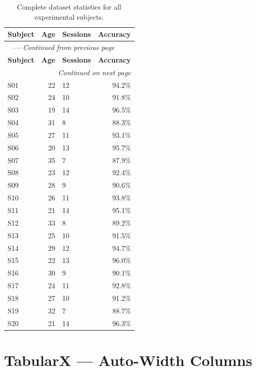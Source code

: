 \documentclass[
    language=english,
    doctype=article,
    institution=none,
]{../../omnilatex}
\begin{document}
\begin{longtable}{lrlr}
    \caption{Complete dataset statistics for all experimental subjects.}
    \label{tab:longtable} \\
    \toprule
    \textbf{Subject} & \textbf{Age} & \textbf{Sessions} & \textbf{Accuracy} \\
    \midrule
    \endfirsthead

    \multicolumn{4}{l}{\tablename\ \thetable{} --- \textit{Continued from previous page}} \\
    \toprule
    \textbf{Subject} & \textbf{Age} & \textbf{Sessions} & \textbf{Accuracy} \\
    \midrule
    \endhead

    \midrule
    \multicolumn{4}{r}{\textit{Continued on next page}} \\
    \endfoot

    \bottomrule
    \endlastfoot

    S01  & 22 & 12 & 94.2\% \\
    S02  & 24 & 10 & 91.8\% \\
    S03  & 19 & 14 & 96.5\% \\
    S04  & 31 &  8 & 88.3\% \\
    S05  & 27 & 11 & 93.1\% \\
    S06  & 20 & 13 & 95.7\% \\
    S07  & 35 &  7 & 87.9\% \\
    S08  & 23 & 12 & 92.4\% \\
    S09  & 28 &  9 & 90.6\% \\
    S10  & 26 & 11 & 93.8\% \\
    S11  & 21 & 14 & 95.1\% \\
    S12  & 33 &  8 & 89.2\% \\
    S13  & 25 & 10 & 91.5\% \\
    S14  & 29 & 12 & 94.7\% \\
    S15  & 22 & 13 & 96.0\% \\
    S16  & 30 &  9 & 90.1\% \\
    S17  & 24 & 11 & 92.8\% \\
    S18  & 27 & 10 & 91.2\% \\
    S19  & 32 &  7 & 88.7\% \\
    S20  & 21 & 14 & 96.3\% \\
\end{longtable}

\section{TabularX — Auto-Width Columns}
\label{sec:tabularx}
\end{document}
